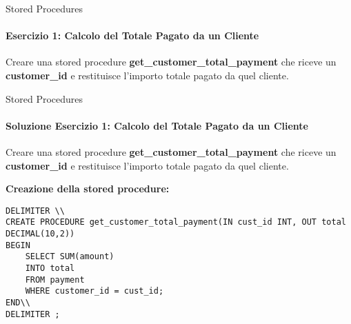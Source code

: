 \def\consegnaSPsExOne{
Creare una stored procedure \textbf{get\_customer\_total\_payment} che riceve un \textbf{customer\_id} e restituisce l'importo totale pagato da quel cliente.
}
\def\consegnaSPsExTwo{
Creare una stored procedure \textbf{insert\_rental} che inserisce una nuova riga nella tabella \textbf{rental} dato:
    \begin{itemize}
        \item \textbf{customer\_id}
        \item \textbf{inventory\_id}
        \item \textbf{staff\_id}
    \end{itemize}
}
\def\consegnaSPsExThree{
Creare una stored procedure \textbf{deactivate\_inactive\_customers} che imposta \textbf{active = 0} per tutti i clienti che non hanno effettuato un pagamento negli ultimi 12 mesi.
}
\def\consegnaFunctionsExOne{
Creare una funzione \textbf{get\_customer\_full\_name} che prende un \textbf{customer\_id} e restituisce il nome completo (ad esempio, 'John Smith') come stringa unica.
}
\def\consegnaFunctionsExTwo{
Creare una funzione \textbf{get\_rental\_count} che restituisce il numero di noleggi effettuati da un determinato \textbf{customer\_id}.
}
\def\consegnaFunctionsExThree{
Creare una funzione \textbf{is\_film\_available} che prende un \textbf{film\_id} e restituisce 1 se c'\`e almeno una copia di quel film nell'inventario, altrimenti 0.
}
\def\consegnaTriggersExOne{
Creare un trigger che memorizzi il \textbf{titolo} e il \textbf{timestamp} di cancellazione di qualsiasi film che viene eliminato dalla \textbf{tabella film}.

Utilizzare una nuova tabella chiamata \textbf{deleted\_films\_log}.
}
\def\consegnaTriggersExTwo{
Creare un trigger che aggiorni una tabella \textbf{customer\_payment\_count} ogni volta che viene inserito un pagamento.
Se il cliente esiste gi\`a nella tabella, incrementare il suo conteggio; altrimenti, inserirlo con count = 1.

Prima di tutto, creare una tabella di riepilogo \textbf{customer\_payment\_count(customer\_id, payment\_count)}.
}
\def\consegnaTriggersExThree{
Creare un trigger che, prima di cancellare un cliente, copia i dati del cliente in una tabella \textbf{archived\_customers} per scopi di registrazione.
}
%
\begin{frame}[fragile]{Stored Procedures}
\framesubtitle{Esercizio 1: Calcolo del Totale Pagato da un Cliente}
\consegnaSPsExOne
\end{frame}
%
\begin{frame}[fragile]{Stored Procedures}
\framesubtitle{Soluzione Esercizio 1: Calcolo del Totale Pagato da un Cliente}
\consegnaSPsExOne

\vspace{.2cm}

\textbf{Creazione della stored procedure:}
\begin{lstlisting}
DELIMITER \\
CREATE PROCEDURE get_customer_total_payment(IN cust_id INT, OUT total DECIMAL(10,2))
BEGIN
    SELECT SUM(amount)
    INTO total
    FROM payment
    WHERE customer_id = cust_id;
END\\
DELIMITER ;
\end{lstlisting}
\end{frame}
